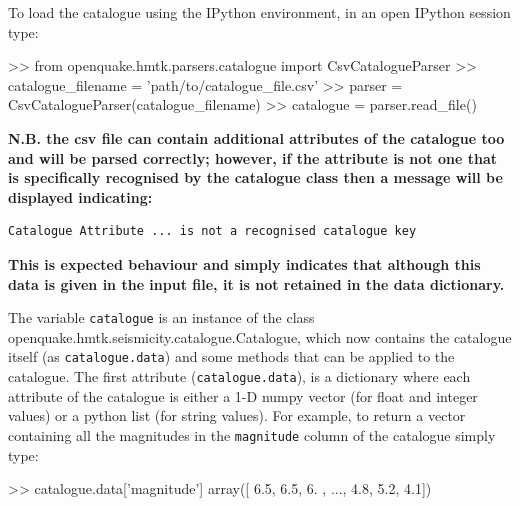 To load the catalogue using the IPython environment, in an open IPython session type:

\begin{python}
>> from openquake.hmtk.parsers.catalogue import CsvCatalogueParser
>> catalogue_filename = 'path/to/catalogue_file.csv'
>> parser = CsvCatalogueParser(catalogue_filename)
>> catalogue = parser.read_file()
\end{python}

\textbf{N.B. the csv file can contain additional attributes of the catalogue too and will be parsed correctly; however, if the attribute is not one that is specifically recognised by the catalogue class then a message will be displayed indicating:}

\begin{Verbatim}[frame=single, commandchars=\\\{\}, fontsize=\scriptsize, samepage=true]
Catalogue Attribute ... is not a recognised catalogue key 
\end{Verbatim}

\textbf{This is expected behaviour and simply indicates that although this data is given in the input file, it is not retained in the data dictionary.}

The variable \verb=catalogue= is an instance of the class openquake.hmtk.seismicity.catalogue.Catalogue, which now contains the catalogue itself (as \verb=catalogue.data=) and some methods that can be applied to the catalogue. The first attribute (\verb=catalogue.data=), is a dictionary where each attribute of the catalogue is either a 1-D numpy vector (for float and integer values) or a python list (for string values). For example, to return a vector containing all the magnitudes in the \verb=magnitude= column of the catalogue simply type:

\begin{python}
>> catalogue.data['magnitude']
array([ 6.5,  6.5,  6. , ...,  4.8,  5.2,  4.1])
\end{python}

